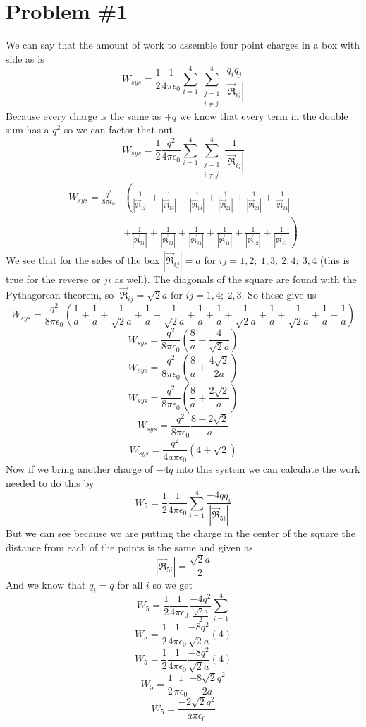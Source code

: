 \documentclass[11pt]{article}
\numberwithin{equation}{section}
\newcommand{\scrptR}{\vec{\mathfrak{R}}}
\begin{document}


\section{Problem \#1}
We can say that the amount of work to assemble four point charges in a box with side as is
\begin{equation}
W_{sys} = \frac{1}{2}\frac{1}{4\pi\epsilon_0}\sum_{i=1}^4\sum_{\substack{j=1\\i\neq j}}^4\frac{q_iq_j}{|\scrptR_{ij}|}
\label{worksys}
\end{equation}
Because every charge is the same as $+q$ we know that every term in the double sum has a $q^2$ so we can factor that out
$$W_{sys} = \frac{1}{2}\frac{q^2}{4\pi\epsilon_0}\sum_{i=1}^4\sum_{\substack{j=1\\i\neq j}}^4\frac{1}{|\scrptR_{ij}|}$$
\begin{align*}
W_{sys} = \frac{q^2}{8\pi\epsilon_0}&\left(\frac{1}{|\scrptR_{12}|} + \frac{1}{|\scrptR_{13}|} + \frac{1}{|\scrptR_{14}|} + \frac{1}{|\scrptR_{21}|} + \frac{1}{|\scrptR_{23}|} + \frac{1}{|\scrptR_{24}|}\right. \\
&\left. + \frac{1}{|\scrptR_{31}|} + \frac{1}{|\scrptR_{32}|} + \frac{1}{|\scrptR_{34}|} + \frac{1}{|\scrptR_{41}|} + \frac{1}{|\scrptR_{42}|} + \frac{1}{|\scrptR_{43}|}\right)
\end{align*}
We see that for the sides of the box $|\scrptR_{ij}| = a$ for $ij = 1,2;\ 1,3;\ 2,4;\ 3,4$ (this is true for the reverse or $ji$ as well). The diagonals of the square are found with the Pythagorean theorem, so $|\scrptR_{ij} = \sqrt{2}a$ for $ij = 1,4;\ 2,3$. So these give us
$$W_{sys} = \frac{q^2}{8\pi\epsilon_0}\left(\frac{1}{a} + \frac{1}{a} + \frac{1}{\sqrt{2}a} + \frac{1}{a} + \frac{1}{\sqrt{2}a} + \frac{1}{a} + \frac{1}{a} + \frac{1}{\sqrt{2}a} + \frac{1}{a} + \frac{1}{\sqrt{2}a} + \frac{1}{a} + \frac{1}{a}\right)$$ 
$$W_{sys} = \frac{q^2}{8\pi\epsilon_0}\left(\frac{8}{a} + \frac{4}{\sqrt{2}a}\right)$$
$$W_{sys} = \frac{q^2}{8\pi\epsilon_0}\left(\frac{8}{a} + \frac{4\sqrt{2}}{2a}\right)$$
$$W_{sys} = \frac{q^2}{8\pi\epsilon_0}\left(\frac{8}{a} + \frac{2\sqrt{2}}{a}\right)$$
$$W_{sys} = \frac{q^2}{8\pi\epsilon_0}\frac{8+2\sqrt{2}}{a}$$
$$W_{sys} = \frac{q^2}{4a\pi\epsilon_0}(4+\sqrt{2})$$
Now if we bring another charge of $-4q$ into this system we can calculate the work needed to do this by
$$W_5 = \frac{1}{2}\frac{1}{4\pi\epsilon_0}\sum_{i=1}^4\frac{-4qq_i}{|\scrptR_{5i}|}$$
But we can see because we are putting the charge in the center of the square the distance from each of the points is the same and given as 
$$|\scrptR_{5i}| = \frac{\sqrt{2}a}{2}$$
And we know that $q_i = q$ for all $i$ so we get
$$W_5 = \frac{1}{2}\frac{1}{4\pi\epsilon_0}\frac{-4q^2}{\frac{\sqrt{2}a}{2}}\sum_{i=1}^4$$
$$W_5 = \frac{1}{2}\frac{1}{4\pi\epsilon_0}\frac{-8q^2}{\sqrt{2}a}(4)$$
$$W_5 = \frac{1}{2}\frac{1}{4\pi\epsilon_0}\frac{-8q^2}{\sqrt{2}a}(4)$$
$$W_5 = \frac{1}{2}\frac{1}{\pi\epsilon_0}\frac{-8\sqrt{2}q^2}{2a}$$
$$W_5 = \frac{-2\sqrt{2}q^2}{a\pi\epsilon_0}$$
\end{document}

